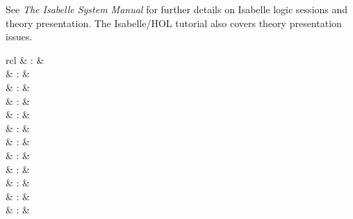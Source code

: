 \begin{isabellebody}
\begin{isamarkuptext}
  \medskip See \emph{The Isabelle System Manual} \cite{isabelle-sys}
  for further details on Isabelle logic sessions and theory
  presentation.  The Isabelle/HOL tutorial \cite{isabelle-hol-book}
  also covers theory presentation issues.%
\end{isamarkuptext}%
\isamarkuptrue%
%
\isamarkuptrue%
%
\begin{isamarkuptext}%
\begin{matharray}{rcl}
    \hypertarget{command.header}{\hyperlink{command.header}{\mbox{}}} & : &  \\[0.5ex]
    \hypertarget{command.chapter}{\hyperlink{command.chapter}{\mbox{}}} & : &  \\
    \hypertarget{command.section}{\hyperlink{command.section}{\mbox{}}} & : &  \\
    \hypertarget{command.subsection}{\hyperlink{command.subsection}{\mbox{}}} & : &  \\
    \hypertarget{command.subsubsection}{\hyperlink{command.subsubsection}{\mbox{}}} & : &  \\
    \hypertarget{command.text}{\hyperlink{command.text}{\mbox{}}} & : &  \\
    \hypertarget{command.text-raw}{\hyperlink{command.text-raw}{\mbox{}}} & : &  \\[0.5ex]
    \hypertarget{command.sect}{\hyperlink{command.sect}{\mbox{}}} & : &  \\
    \hypertarget{command.subsect}{\hyperlink{command.subsect}{\mbox{}}} & : &  \\
    \hypertarget{command.subsubsect}{\hyperlink{command.subsubsect}{\mbox{}}} & : &  \\
    \hypertarget{command.txt}{\hyperlink{command.txt}{\mbox{}}} & : &  \\
    \hypertarget{command.txt-raw}{\hyperlink{command.txt-raw}{\mbox{}}} & : &  \\
  \end{matharray}


\end{isamarkuptext}
\end{isabellebody}
